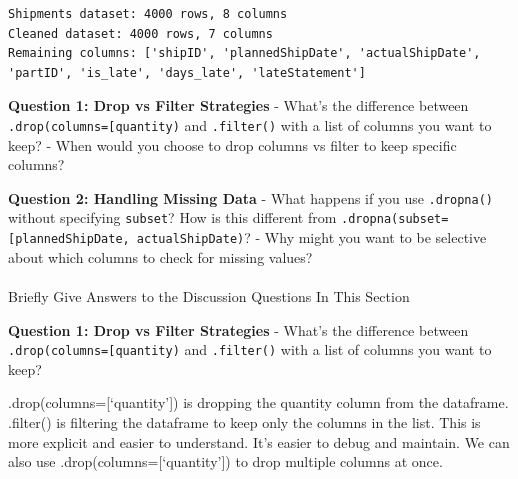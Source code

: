 \documentclass[
]{article}
\makeatletter
\let\oldparagraph\paragraph
\renewcommand{\paragraph}{
    \@ifstar
      \xxxParagraphStar
      \xxxParagraphNoStar
  }
\newcommand{\xxxParagraphStar}[1]{\oldparagraph*{#1}\mbox{}}
\newcommand{\xxxParagraphNoStar}[1]{\oldparagraph{#1}\mbox{}}
\makeatother
\begin{document}
\begin{verbatim}
Shipments dataset: 4000 rows, 8 columns
Cleaned dataset: 4000 rows, 7 columns
Remaining columns: ['shipID', 'plannedShipDate', 'actualShipDate', 'partID', 'is_late', 'days_late', 'lateStatement']
\end{verbatim}

\begin{tcolorbox}[enhanced jigsaw, colbacktitle=quarto-callout-important-color!10!white, toptitle=1mm, colframe=quarto-callout-important-color-frame, bottomtitle=1mm, colback=white, left=2mm, breakable, coltitle=black, bottomrule=.15mm, rightrule=.15mm, titlerule=0mm, opacityback=0, title=\textcolor{quarto-callout-important-color}{\faExclamation}\hspace{0.5em}{🤔 Discussion Questions: Drop Mental Model}, arc=.35mm, opacitybacktitle=0.6, toprule=.15mm, leftrule=.75mm]

\textbf{Question 1: Drop vs Filter Strategies} - What's the difference
between
\texttt{.drop(columns={[}\textquotesingle{}quantity\textquotesingle{}{]})}
and \texttt{.filter()} with a list of columns you want to keep? - When
would you choose to drop columns vs filter to keep specific columns?

\textbf{Question 2: Handling Missing Data} - What happens if you use
\texttt{.dropna()} without specifying \texttt{subset}? How is this
different from
\texttt{.dropna(subset={[}\textquotesingle{}plannedShipDate\textquotesingle{},\ \textquotesingle{}actualShipDate\textquotesingle{}{]})}?
- Why might you want to be selective about which columns to check for
missing values?

\end{tcolorbox}

\paragraph{Briefly Give Answers to the Discussion Questions In This
Section}\label{briefly-give-answers-to-the-discussion-questions-in-this-section-2}

\textbf{Question 1: Drop vs Filter Strategies} - What's the difference
between
\texttt{.drop(columns={[}\textquotesingle{}quantity\textquotesingle{}{]})}
and \texttt{.filter()} with a list of columns you want to keep?

.drop(columns={[}`quantity'{]}) is dropping the quantity column from the
dataframe. .filter() is filtering the dataframe to keep only the columns
in the list. This is more explicit and easier to understand. It's easier
to debug and maintain. We can also use .drop(columns={[}`quantity'{]})
to drop multiple columns at once.
\end{document}
